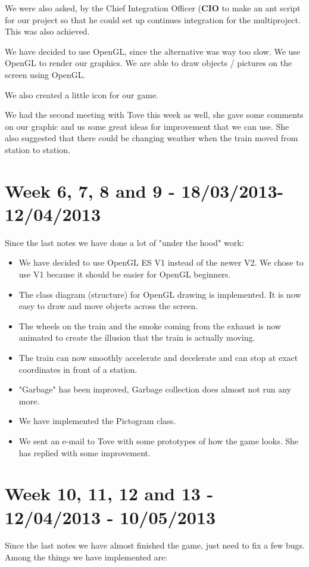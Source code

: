 We were also asked, by the Chief Integration Officer (\textbf{CIO} to make an ant script for our project so that he could set up continues integration for the multiproject. This was also achieved. 

We have decided to use OpenGL, since the alternative was way too slow. We use OpenGL to render our graphics. We are able to draw objects / pictures on the screen using OpenGL. 

We also created a little icon for our game. 

We had the second meeting with Tove this week as well, she gave some comments on our graphic and us some great ideas for improvement that we can use. She also suggested that there could be changing weather when the train moved from station to station. 

\section*{Week 6, 7, 8 and 9 - 18/03/2013-12/04/2013}
Since the last notes we have done a lot of "under the hood" work:

\begin{itemize}
\item We have decided to use OpenGL ES V1 instead of the newer V2. We chose to use V1 because it should be easier for OpenGL beginners. 
\item The class diagram (structure) for OpenGL drawing is implemented. It is now easy to draw and move objects across the screen. 
\item The wheels on the train and the smoke coming from the exhaust is now animated to create the illusion that the train is actually moving. 
\item The train can now smoothly accelerate and decelerate and can stop at exact coordinates in front of a station. 
\item "Garbage" has been improved, Garbage collection does almost not run any more. 
\item We have implemented the Pictogram class.
\item We sent an e-mail to Tove with some prototypes of how the game looks. She has replied with some improvement.
\end{itemize} 

\section*{Week 10, 11, 12 and 13 - 12/04/2013 - 10/05/2013}
Since the last notes we have almost finished the game, just need to fix a few bugs. Among the things we have implemented are:


